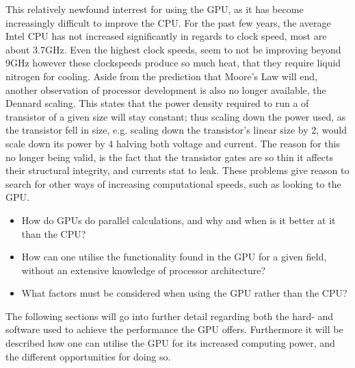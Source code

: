 This relatively newfound interrest for using the GPU, as it has become increasingly difficult to improve the CPU.
For the past few years, the average Intel CPU has not increased significantly in regards to clock speed, most are about 3.7GHz.
Even the highest clock speeds, seem to not be improving beyond 9GHz however these clockspeeds produce so much heat, that they require liquid nitrogen for cooling.
Aside from the prediction that Moore's Law will end, another observation of processor development is also no longer available, the Dennard scaling.
This states that the power density required to run a of transistor of a given size will stay constant; thus scaling down the power used, as the transistor fell in size, e.g. scaling down the transistor's linear size by 2, would scale down its power by 4 halving both voltage and current.\citep{DennardScaling}
The reason for this no longer being valid, is the fact that the transistor gates are so thin it affects their structural integrity, and currents stat to leak.\citep{CPUClockSpeeds}
These problems give reason to search for other ways of increasing computational speeds, such as looking to the GPU.


\begin{itemize}
	\item How do GPUs do parallel calculations, and why and when is it better at it than the CPU?
	\item How can one utilise the functionality found in the GPU for a given field, without an extensive knowledge of processor architecture?
	\item What factors must be considered when using the GPU rather than the CPU? 
\end{itemize}

The following sections will go into further detail regarding both the hard- and software used to achieve the performance the GPU offers.
Furthermore it will be described how one can utilise the GPU for its increased computing power, and the different opportunities for doing so. 

\newpage
